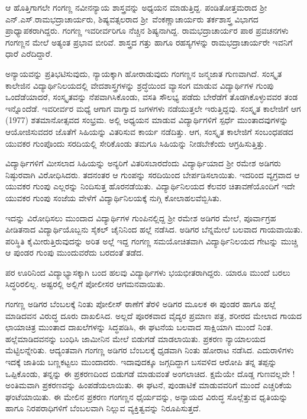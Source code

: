 {ಆ ಹೊತ್ತಿಗಾಗಲೇ ಗಂಗಣ್ಣ ನವೀನನ್ಯಾಯ ಶಾಸ್ತ್ರವನ್ನು ಅಧ್ಯಯನ \hbox{ಮಾಡುತ್ತಿದ್ದ.} ಪಂಡಿತೋತ್ತಮರಾದ ಶ್ರೀ ಎನ್.ಎಸ್.ರಾಮಭದ್ರಾಚಾರ್ಯರು, ಶಿಷ್ಯವತ್ಸಲರಾದ \hbox{ಶ್ರೀ ವೆಂಕಣ್ಣಾಚಾರ್ಯರು} ತರ್ಕಶಾಸ್ತ್ರ ವಿಭಾಗದ ಪ್ರಾಧ್ಯಾಪಕರಾಗಿದ್ದರು. ಗಂಗಣ್ಣ ಇವರೀರ್ವರಿಗೂ ನೆಚ್ಚಿನ ಶಿಷ್ಯನಾಗಿದ್ದ. ರಾಮಭದ್ರಾಚಾರ್ಯರ ಪಾಠ  \enginline{-}  ಪ್ರವಚನಗಳು ಗಂಗಣ್ಣನ ಮೇಲೆ ಅತ್ಯಂತ ಪ್ರಭಾವ ಬೀರಿವೆ. ಶಾಸ್ತ್ರದ ಗತ್ತು ಹಾಗೂ ರಹಸ್ಯಗಳನ್ನು ರಾಮಭದ್ರಾಚಾರ್ಯರೇ \hbox{ಇವನಿಗೆ} ಧಾರೆ ಎರೆದಿದ್ದಾರೆ.

ಅನ್ಯಾಯವನ್ನು ಪ್ರತಿಭಟಿಸುವುದು, ನ್ಯಾಯಕ್ಕಾಗಿ ಹೋರಾಡುವುದು ಗಂಗಣ್ಣನ ಜನ್ಮಜಾತ ಗುಣವಾಗಿದೆ. ಸಂಸ್ಕೃತ ಕಾಲೇಜಿನ ವಿದ್ಯಾರ್ಥಿನಿಲಯದಲ್ಲಿ ವೇದಶಾಸ್ತ್ರ\-ಗಳನ್ನು ಶ್ರದ್ಧೆಯಿಂದ ವ್ಯಾಸಂಗ ಮಾಡುವ ವಿದ್ಯಾರ್ಥಿಗಳ ಗುಂಪು ಒಂದೆಡೆಯಾದರೆ, ಸಂಸ್ಕೃತವನ್ನು ನೆಪವಾಗಿಸಿಕೊಂಡು, ವಸತಿ ಸೌಲಭ್ಯ ಪಡೆದು ಬೇರೆಡೆಗೆ ತೊಡಗಿಕೊಳ್ಳುವವರ ತಂಡ ಇನ್ನೊಂದೆಡೆ. ಇವರೀರ್ವರ ಮಧ್ಯೆ ಆಗಾಗ ವಾಗ್ವಾದ  \enginline{-}  ಜಗಳಗಳು ನಡೆಯುತ್ತಲೇ ಇರುತ್ತಿದ್ದವು. ಸಂಸ್ಕೃತ ಕಾಲೇಜಿಗೆ ಆಗ (1977) ಶತಮಾನೋತ್ಸವದ ಸಂಭ್ರಮ. ಅಲ್ಲಿ ಅಧ್ಯಯನ ಮಾಡುವ ವಿದ್ಯಾರ್ಥಿಗಳಿಗೆ ಸ್ಪರ್ಧೆ ಮುಂತಾದವುಗಳನ್ನು ಆಯೋಜಿಸುವದರ ಜೊತೆಗೆ ಸಿಹಿಯನ್ನು ವಿತರಿಸುವ ಕಾರ್ಯ ನಡೆದಿತ್ತು. ಆಗ, ಸಂಸ್ಕೃತ ಕಾಲೇಜಿಗೆ ಸಂಬಂಧಪಡದ ಯುವಕರ ಗುಂಪೊಂದು ಸರದಿಯಲ್ಲಿ ಸೇರಿಕೊಂಡು ತಮಗೂ ಸಿಹಿಯನ್ನು ನೀಡಬೇಕೆಂದು ಆಗ್ರಹಿಸುತ್ತಿತ್ತು.

ವಿದ್ಯಾರ್ಥಿಗಳಿಗೆ ಮೀಸಲಾದ ಸಿಹಿಯನ್ನು ಅನ್ಯರಿಗೆ ವಿತರಿಸಬಾರದೆಂದು ವಿದ್ಯಾರ್ಥಿ\-ಯಾದ ಶ್ರೀ ರಮೇಶ ಅಡಿಗರು ನಿಷ್ಠುರವಾಗಿ ವಿರೋಧಿಸಿದರು. ತದನಂತರ ಆ ಗುಂಪನ್ನು ಸರದಿಯಿಂದ ಬೇರ್ಪಡಿಸಲಾಯಿತು. ಇದರಿಂದ ವ್ಯಗ್ರವಾದ ಆ ಯುವಕರ ಗುಂಪು ಎಲ್ಲರನ್ನು ನಿಂದಿಸುತ್ತ ಹೊರನಡೆಯಿತು. ವಿದ್ಯಾರ್ಥಿನಿಲಯದ ಕೆಲವರ ಚಿತಾವಣೆಯೊಂದಿಗೆ ಇದೇ ಯುವಕರ ಗುಂಪು ಸಂಜೆಯ ವೇಳೆಗೆ ವಿದ್ಯಾರ್ಥಿನಿಲಯಕ್ಕೆ ನುಗ್ಗಿ ಕೋಲಾಹಲವೆಬ್ಬಿಸಿತು. 

ಇದನ್ನು ವಿರೋಧಿಸಲು ಮುಂದಾದ ವಿದ್ಯಾರ್ಥಿಗಳ ಗುಂಪಿನಲ್ಲಿದ್ದ ಶ್ರೀ ರಮೇಶ ಅಡಿಗರ ಮೇಲೆ, ಪೂರ್ವಾಗ್ರಹ ಪೀಡಿತನಾದ ವಿದ್ಯಾರ್ಥಿಯೊಬ್ಬನು ಸೈಕಲ್ ಚೈನಿನಿಂದ ಹಲ್ಲೆ ನಡೆಸಿದ. ಅಡಿಗರ ಬೆನ್ನಮೇಲೆ ಬಲವಾದ ಗಾಯವಾಯಿತು. ಪರಿಸ್ಥಿತಿ ಕೈಮೀರು\-ತ್ತಿರುವುದನ್ನು ಅರಿತ ಅಲ್ಲೆ ಇದ್ದ ಗಂಗಣ್ಣ ಸಮಯೋಚಿತವಾಗಿ ವಿದ್ಯಾರ್ಥಿನಿಲಯದ ಗೇಟನ್ನು ಮುಚ್ಚಿ ಆ ಪುಂಡರ ಗುಂಪು ಮುಂದುವರೆದು ಬರದಂತೆ ತಡೆದ.
\vskip 2pt

ಪರ ಊರಿನಿಂದ ವಿದ್ಯಾಭ್ಯಾಸಕ್ಕಾಗಿ ಬಂದ ಹಲವು ವಿದ್ಯಾರ್ಥಿಗಳು ಭಯಭೀತ\-ರಾಗಿದ್ದರು. ಯಾರೂ ಮುಂದೆ ಬರಲು ಸಿದ್ಧರಿರಲಿಲ್ಲ. ಅಷ್ಟರಲ್ಲಿ ಅಲ್ಲಿಗೆ ಪೋಲೀಸರ ಆಗಮನವಾಯಿತು. 
\vskip 3pt

ಗಂಗಣ್ಣ ಅಡಿಗರ ಬೆಂಬಲಕ್ಕೆ ನಿಂತು ಪೋಲೀಸ್ ಠಾಣೆಗೆ ತೆರಳಿ ಅಡಿಗರ ಮೂಲಕ ಈ ಪುಂಡರ ಹಾಗೂ ಹಲ್ಲೆ ಮಾಡಿದವನ ವಿರುದ್ಧ ದೂರು ದಾಖಲಿಸಿದ. ಅಲ್ಲದೆ ಪೂರಕವಾದ ವೈದ್ಯರ ಪ್ರಮಾಣ ಪತ್ರ, ಶರೀರದ ಮೇಲಾದ ಗಾಯದ ಛಾಯಾಚಿತ್ರ ಮುಂತಾದ ದಾಖಲೆಗಳನ್ನು ಸಿದ್ಧಪಡಿಸಿ, ಈ ಘಟನೆಯ ಬಲವಾದ ಸಾಕ್ಷಿಯಾಗಿ ಮುಂದೆ ನಿಂತ. ಹಲ್ಲೆಮಾಡಿದವನನ್ನು ಬಂಧಿಸಿ ಜಾಮೀನಿನ ಮೇಲೆ ಬಿಡುಗಡೆ ಮಾಡಲಾಯಿತು. \hbox{ಪ್ರಕರಣ} ನ್ಯಾಯಾಲಯದ ಮೆಟ್ಟಿಲನ್ನೇರಿತು. ಆದ್ಯಂತವಾಗಿ ಗಂಗಣ್ಣ \hbox{ಅಡಿಗರ} \hbox{ಬೆಂಬಲಕ್ಕೆ} ಧೃಡವಾಗಿ ನಿಂತು ಹೋರಾಟ ನಡೆಸಿದ. ಎದುರಾಳಿಗಳು ಇದಕ್ಕೆ ಜಾತಿಯ ಬಣ್ಣ\-ಕಟ್ಟಲು ಮುಂದಾದರು. ಇದಾವುದಕ್ಕೂ ಜಗ್ಗದಿದ್ದಾಗ ಬಸವಳಿದ ಆರೋಪಿ ತನ್ನ ತಪ್ಪನ್ನು ಒಪ್ಪಿಕೊಂಡು, ತನ್ನನ್ನು ಈ ಪ್ರಕರಣದಿಂದ ಬಿಡುಗಡೆ ಮಾಡುವಂತೆ \hbox{ಅಂಗಲಾಚಿದ.} ಕ್ಷಮೆಯೇ ದೊಡ್ಡ ಗುಣವಲ್ಲವೇ ! ಅಂತಿಮವಾಗಿ ಪ್ರಕರಣವನ್ನು ಹಿಂಪಡೆಯ\-ಲಾಯಿತು. ಈ ಘಟನೆ, ಪುಂಡಾಟಿಕೆ ಮಾಡುವವರಿಗೆ ಮುಂದೆ ಎಚ್ಚರಿಕೆಯ ಘಂಟೆಯಾಯಿತು. ಈ ಮೇಲಿನ ಪ್ರಕರಣ ಗಂಗಣ್ಣನ ಧೈರ್ಯವನ್ನು, ಅನ್ಯಾಯದ ವಿರುದ್ಧ ಸೊಲ್ಲೆತ್ತುವ ಧೃತಿಯನ್ನು ಹಾಗೂ ನಿರಪರಾಧಿಗಳಿಗೆ ಬೆಂಬಲವಾಗಿ ನಿಲ್ಲುವ \hbox{ವ್ಯಕ್ತಿತ್ವವನ್ನು} ನಿರೂಪಿಸುತ್ತದೆ.  
\vskip 3pt

}
